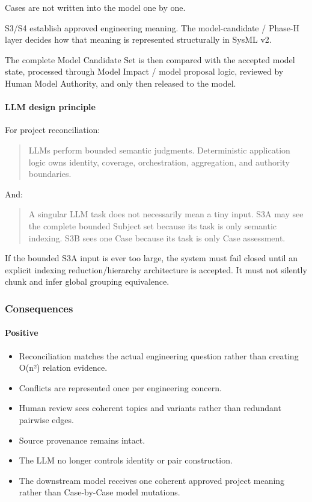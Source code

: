 Cases are not written into the model one by one.

S3/S4 establish approved engineering meaning. The model-candidate / Phase-H layer decides how that meaning is represented structurally in SysML v2.

The complete Model Candidate Set is then compared with the accepted model state, processed through Model Impact / model proposal logic, reviewed by Human Model Authority, and only then released to the model.

\hypertarget{llm-design-principle}{%
\paragraph{LLM design principle}\label{llm-design-principle}}

For project reconciliation:

\begin{quote}
LLMs perform bounded semantic judgments. Deterministic application logic owns identity, coverage, orchestration, aggregation, and authority boundaries.
\end{quote}

And:

\begin{quote}
A singular LLM task does not necessarily mean a tiny input. S3A may see the complete bounded Subject set because its task is only semantic indexing. S3B sees one Case because its task is only Case assessment.
\end{quote}

If the bounded S3A input is ever too large, the system must fail closed until an explicit indexing reduction/hierarchy architecture is accepted. It must not silently chunk and infer global grouping equivalence.

\hypertarget{consequences-16}{%
\subsubsection{Consequences}\label{consequences-16}}

\hypertarget{positive-7}{%
\paragraph{Positive}\label{positive-7}}

\begin{itemize}
\tightlist
\item
  Reconciliation matches the actual engineering question rather than creating O(n²) relation evidence.
\item
  Conflicts are represented once per engineering concern.
\item
  Human review sees coherent topics and variants rather than redundant pairwise edges.
\item
  Source provenance remains intact.
\item
  The LLM no longer controls identity or pair construction.
\item
  The downstream model receives one coherent approved project meaning rather than Case-by-Case model mutations.
\end{itemize}

